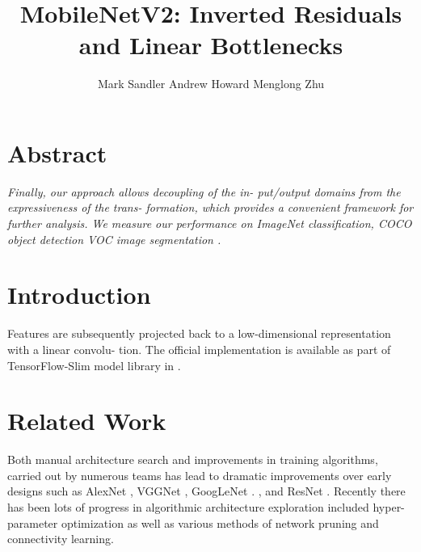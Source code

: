 \documentclass{article}
\title{\textbf{MobileNetV2: Inverted Residuals and Linear Bottlenecks}}
\author{Mark Sandler \hspace{0.7in} Andrew Howard \hspace{0.7in} Menglong Zhu}
\begin{document}
\maketitle
\section{Abstract}
\textit{Finally, our approach allows decoupling of the in-
put/output domains from the expressiveness of the trans-
formation, which provides a convenient framework for
further analysis. We measure our performance on
ImageNet \cite{DBLP:journals/corr/RussakovskyDSKSMHKKBBF14} classification, COCO object detection \cite{DBLP:journals/corr/LinMBHPRDZ14} VOC image segmentation \cite{Everingham2014ThePV}.}

\section{Introduction}
Features are subsequently projected back to a
low-dimensional representation with a linear convolu-
tion. The official implementation is available as part of
TensorFlow-Slim model library in \cite{tensorflowmodels}.

\section{Related Work}
Both manual architecture search and improvements in
training algorithms, carried out by numerous teams has
lead to dramatic improvements over early designs such
as AlexNet \cite{NIPS2012_c399862d}, VGGNet \cite{simonyan2014very}, GoogLeNet \cite{DBLP:journals/corr/SzegedyLJSRAEVR14}. , and
ResNet \cite{DBLP:journals/corr/HeZRS15}. Recently there has been lots of progress in algorithmic architecture exploration included hyper-
parameter optimization \cite{10.5555/2188385.2188395,snoek2012practical} as well as various methods of network pruning and
connectivity learning.


\end{document}
